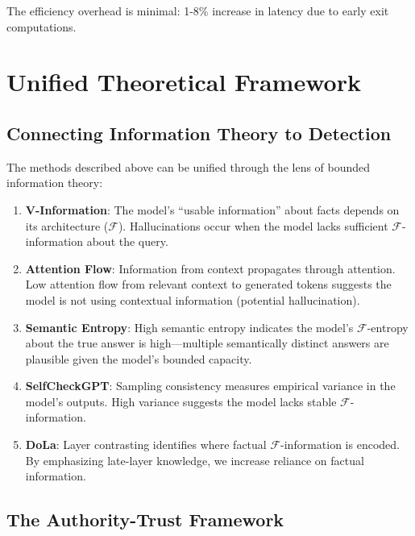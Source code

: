 \documentclass[11pt]{article}
\newcommand{\F}{\mathcal{F}}
\begin{document}
The efficiency overhead is minimal: 1-8\% increase in latency due to early exit computations.

\section{Unified Theoretical Framework}

\subsection{Connecting Information Theory to Detection}

The methods described above can be unified through the lens of bounded information theory:

\begin{enumerate}
    \item \textbf{V-Information}: The model's ``usable information'' about facts depends on its architecture ($\F$). Hallucinations occur when the model lacks sufficient $\F$-information about the query.

    \item \textbf{Attention Flow}: Information from context propagates through attention. Low attention flow from relevant context to generated tokens suggests the model is not using contextual information (potential hallucination).

    \item \textbf{Semantic Entropy}: High semantic entropy indicates the model's $\F$-entropy about the true answer is high---multiple semantically distinct answers are plausible given the model's bounded capacity.

    \item \textbf{SelfCheckGPT}: Sampling consistency measures empirical variance in the model's outputs. High variance suggests the model lacks stable $\F$-information.

    \item \textbf{DoLa}: Layer contrasting identifies where factual $\F$-information is encoded. By emphasizing late-layer knowledge, we increase reliance on factual information.
\end{enumerate}

\subsection{The Authority-Trust Framework}
\end{document}
